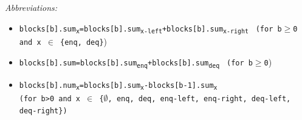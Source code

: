\documentclass[10pt]{article}
\newcommand{\sub}[1]{\textsubscript{#1}}
\renewcommand{\tt}[1]{\texttt{#1}}
\renewcommand{\it}[1]{\textit{#1}}
\theoremstyle{definition}
\begin{document}
\begin{footnotesize}
  

\it{Abbreviations:}
\begin{itemize}
 \item \tt{blocks[b].sum\sub{x}=blocks[b].sum\sub{x-left}+blocks[b].sum\sub{x-right}}  \tt{ (for b$\geq$0 and x $\in$ \{enq, deq\}})
 \item \tt{blocks[b].sum=blocks[b].sum\sub{enq}+blocks[b].sum\sub{deq}}  \tt{ (for b$\geq$0})
  \item \tt{blocks[b].num\sub{x}=blocks[b].sum\sub{x}-blocks[b-1].sum\sub{x}} \\ \tt{(for b>0 and x $\in$ \{$\emptyset$, enq, deq, enq-left, enq-right, deq-left, deq-right\})}
\end{itemize}
\end{footnotesize}

\pagebreak

\end{document}
